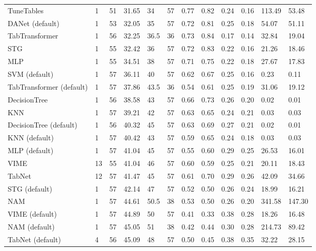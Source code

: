 \begin{tabular}{lllllrllllll}
TuneTables & 1 & 51 & 31.65 & 34 & 57 & 0.77 & 0.82 & 0.24 & 0.16 & 113.49 & 53.48 \\
DANet (default) & 1 & 53 & 32.05 & 35 & 57 & 0.72 & 0.81 & 0.25 & 0.18 & 54.07 & 51.11 \\
TabTransformer & 1 & 56 & 32.25 & 36.5 & 36 & 0.73 & 0.84 & 0.17 & 0.14 & 32.84 & 19.04 \\
STG & 1 & 55 & 32.42 & 36 & 57 & 0.72 & 0.83 & 0.22 & 0.16 & 21.26 & 18.46 \\
MLP & 1 & 55 & 34.51 & 38 & 57 & 0.71 & 0.75 & 0.22 & 0.18 & 27.67 & 17.83 \\
SVM (default) & 1 & 57 & 36.11 & 40 & 57 & 0.62 & 0.67 & 0.25 & 0.16 & 0.23 & 0.11 \\
TabTransformer (default) & 1 & 57 & 37.86 & 43.5 & 36 & 0.54 & 0.61 & 0.25 & 0.19 & 31.06 & 19.12 \\
DecisionTree & 1 & 56 & 38.58 & 43 & 57 & 0.66 & 0.73 & 0.26 & 0.20 & 0.02 & 0.01 \\
KNN & 1 & 57 & 39.21 & 42 & 57 & 0.63 & 0.65 & 0.24 & 0.21 & 0.03 & 0.03 \\
DecisionTree (default) & 1 & 56 & 40.32 & 45 & 57 & 0.63 & 0.69 & 0.27 & 0.21 & 0.02 & 0.01 \\
KNN (default) & 1 & 57 & 40.42 & 43 & 57 & 0.59 & 0.65 & 0.24 & 0.18 & 0.03 & 0.03 \\
MLP (default) & 1 & 57 & 41.04 & 45 & 57 & 0.55 & 0.60 & 0.29 & 0.25 & 26.53 & 16.01 \\
VIME & 13 & 55 & 41.04 & 46 & 57 & 0.60 & 0.59 & 0.25 & 0.21 & 20.11 & 18.43 \\
TabNet & 12 & 57 & 41.47 & 45 & 57 & 0.61 & 0.70 & 0.29 & 0.26 & 42.09 & 34.66 \\
STG (default) & 1 & 57 & 42.14 & 47 & 57 & 0.52 & 0.50 & 0.26 & 0.24 & 18.99 & 16.21 \\
NAM & 1 & 57 & 44.61 & 50.5 & 38 & 0.53 & 0.50 & 0.26 & 0.20 & 341.58 & 147.30 \\
VIME (default) & 1 & 57 & 44.89 & 50 & 57 & 0.41 & 0.33 & 0.38 & 0.28 & 18.26 & 16.48 \\
NAM (default) & 1 & 57 & 45.05 & 51 & 38 & 0.42 & 0.44 & 0.30 & 0.28 & 214.73 & 89.42 \\
TabNet (default) & 4 & 56 & 45.09 & 48 & 57 & 0.50 & 0.45 & 0.38 & 0.35 & 32.22 & 28.15 \\
\bottomrule
\end{tabular}
